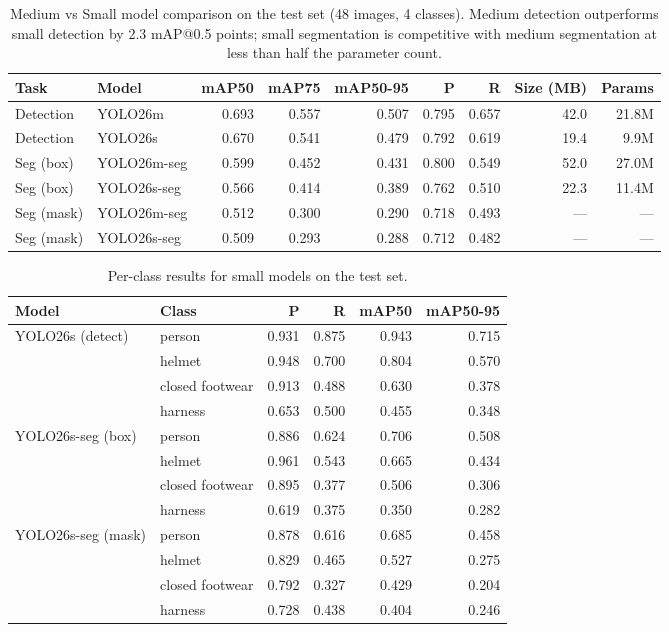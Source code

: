 \documentclass[a4paper,11pt]{article}
\begin{document}
\begin{table}[H]
\centering
\small
\begin{tabular}{llrrrrrrr}
\toprule
\textbf{Task} & \textbf{Model} & \textbf{mAP50} & \textbf{mAP75} & \textbf{mAP50-95} & \textbf{P} & \textbf{R} & \textbf{Size (MB)} & \textbf{Params} \\
\midrule
Detection & YOLO26m & 0.693 & 0.557 & 0.507 & 0.795 & 0.657 & 42.0 & 21.8M \\
Detection & YOLO26s & 0.670 & 0.541 & 0.479 & 0.792 & 0.619 & 19.4 & 9.9M \\
\midrule
Seg (box) & YOLO26m-seg & 0.599 & 0.452 & 0.431 & 0.800 & 0.549 & 52.0 & 27.0M \\
Seg (box) & YOLO26s-seg & 0.566 & 0.414 & 0.389 & 0.762 & 0.510 & 22.3 & 11.4M \\
\midrule
Seg (mask) & YOLO26m-seg & 0.512 & 0.300 & 0.290 & 0.718 & 0.493 & --- & --- \\
Seg (mask) & YOLO26s-seg & 0.509 & 0.293 & 0.288 & 0.712 & 0.482 & --- & --- \\
\bottomrule
\end{tabular}
\caption{Medium vs Small model comparison on the test set (48 images, 4 classes). Medium detection outperforms small detection by 2.3 mAP@0.5 points; small segmentation is competitive with medium segmentation at less than half the parameter count.}
\label{tab:m-vs-s}
\end{table}

\begin{table}[H]
\centering
\small
\begin{tabular}{llrrrr}
\toprule
\textbf{Model} & \textbf{Class} & \textbf{P} & \textbf{R} & \textbf{mAP50} & \textbf{mAP50-95} \\
\midrule
YOLO26s (detect) & person & 0.931 & 0.875 & 0.943 & 0.715 \\
 & helmet & 0.948 & 0.700 & 0.804 & 0.570 \\
 & closed footwear & 0.913 & 0.488 & 0.630 & 0.378 \\
 & harness & 0.653 & 0.500 & 0.455 & 0.348 \\
\midrule
YOLO26s-seg (box) & person & 0.886 & 0.624 & 0.706 & 0.508 \\
 & helmet & 0.961 & 0.543 & 0.665 & 0.434 \\
 & closed footwear & 0.895 & 0.377 & 0.506 & 0.306 \\
 & harness & 0.619 & 0.375 & 0.350 & 0.282 \\
\midrule
YOLO26s-seg (mask) & person & 0.878 & 0.616 & 0.685 & 0.458 \\
 & helmet & 0.829 & 0.465 & 0.527 & 0.275 \\
 & closed footwear & 0.792 & 0.327 & 0.429 & 0.204 \\
 & harness & 0.728 & 0.438 & 0.404 & 0.246 \\
\bottomrule
\end{tabular}
\caption{Per-class results for small models on the test set.}
\label{tab:perclass-small}
\end{table}
\end{document}
